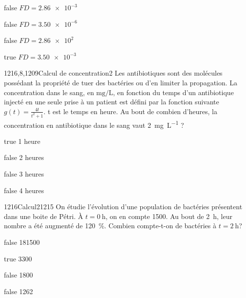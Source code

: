 \documentclass[11pt]{article}
\begin{document}
            \begin{reponses}
            	\item[false]  $FD = \SI{2.86e-3}{} $
            	\item[false]  $FD = \SI{3.50e-6}{}$
                \item[false]  $FD = \SI{2.86e2}{}$
                \item[true]   $FD = \SI{3.50e-3}{}$
            \end{reponses}

      
			
			\begin{question}{1216,8,1209}{Calcul de concentration}{2}{}
				Les antibiotiques sont des molécules possédant la propriété de tuer des bactéries ou d'en limiter la propagation. La concentration dans le sang, en $\si{\milli\gram\per\liter}$, en fonction du temps d'un antibiotique injecté en une seule prise à un patient est défini par la fonction suivante $g(t) = \frac{4t}{t^{2}+1}$. t est le temps en heure. Au bout de combien d'heures, la concentration en antibiotique dans le sang vaut \SI{2}{\milli\gram\per\liter}  ?

            \end{question}

            \begin{reponses}
            	\item[true] 1 heure
            	\item[false]  2 heures
                \item[false]  3 heures
                \item[false] 4  heures
            \end{reponses}
			
				\begin{question}{1216}{Calcul}{2}{1215}
                On étudie l'évolution d'une population de bactéries présentent dans une boite de Pétri. À $t=\SI{0}{\hour}$, on en compte \num{1500}. Au bout de \SI{2}{\hour}, leur nombre a été augmenté de \SI{120}{\percent}. Combien compte-t-on de bactéries à $t=\SI{2}{\hour}$?
            \end{question}

            \begin{reponses}
            	\item[false] \num{181500}
            	\item[true]  \num{3300}
                \item[false]  \num{1800}
                \item[false] \num{1262}
            \end{reponses}
			
\end{document}
